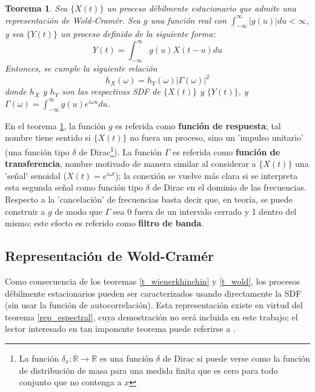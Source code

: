 \documentclass[12pt,a4paper]{mitthesis}
\newtheorem{thrm}{Teorema}
\newcommand{\R}{\mathbb{R}}
\newcommand{\intR}{\int_{-\infty}^{\infty}}
\newcommand{\dirac}{$\delta$  de Dirac}
\newcommand{\abso}[1]{\left| #1 \right|}
\begin{document}
\begin{thrm}
Sea $\{ X(t) \}$ un proceso d\'ebilmente estacionario que admite una 
representaci\'on de Wold-Cram\'er. 
Sea $g$ una funci\'on real con $\intR \abso{g(u)} du < \infty$, y 
sea $\{ Y(t) \}$ un proceso definido de la siguiente forma:
\begin{equation*}
Y(t) = \intR g(u) X(t-u) du
\end{equation*}
Entonces, se cumple la siguiente relaci\'on
\begin{equation*}
h_X(\omega) = h_Y(\omega) \abso{\Gamma(\omega)}^{2}
\end{equation*}
donde $h_X$ y $h_Y$ son las respectivas SDF de $\{X(t)\}$ y $\{Y(t)\}$, y 
$\Gamma(\omega) = \intR g(u) e^{i \omega u} du$.
\label{filtro}
\end{thrm}

En el teorema \ref{filtro}, la funci\'on $g$ es referida como \textbf{funci\'on de respuesta}; tal 
nombre tiene sentido si $\{X(t)\}$ no fuera un proceso, sino un 'impulso unitario' (una funci\'on 
tipo \dirac \footnote{La funci\'on $\delta_x:\R\rightarrow \R$ es una funci\'on $\delta$ de Dirac 
si puede verse como la funci\'on de distribuci\'on de masa para una medida finita que es cero para 
todo conjunto que no contenga a $x$}).
La funci\'on $\Gamma$ es referida como \textbf{funci\'on de transferencia}, nombre motivado de 
manera similar al considerar a $\{X(t)\}$ una 'se\~nal' senoidal ($X(t) = e^{i \omega t}$); la 
conexi\'on se vuelve m\'as clara si se interpreta esta segunda se\~nal como funci\'on tipo \dirac 
en el dominio de las frecuencias.
Respecto a la 'cancelaci\'on' de frecuencias basta decir que, en teor\'ia, se puede construir a $g$ 
de modo que $\Gamma$ sea 0 fuera de un intervalo cerrado y 1 dentro del mismo; este efecto es 
referido como \textbf{filtro de banda}.


\subsection{Representaci\'on de Wold-Cram\'er}

Como consecuencia de los teoremas \ref{t_wienerkhinchin} y \ref{t_wold}, los procesos d\'ebilmente 
estacionarios pueden ser caracterizados usando directamente la SDF (sin usar la funci\'on de
autocorrelaci\'on).
Esta representaci\'on existe en virtud del teorema \ref{rep_espectral}, cuya demostraci\'on no 
ser\'a incluida en este trabajo; el lector interesado en tan imponente teorema puede referirse a 
\cite{Priestley81}.
\end{document}
